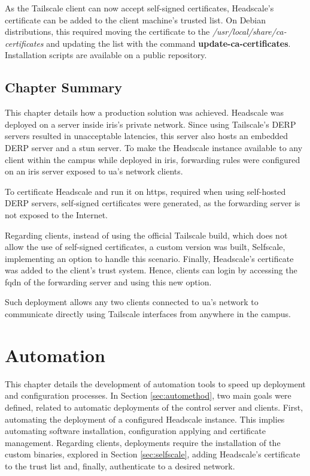 \documentclass[11pt,twoside,a4paper]{report}
\begin{document}
As the Tailscale client can now accept self-signed certificates, Headscale's certificate can be added to the client machine's trusted list. On Debian distributions, this required moving the certificate to the \emph{/usr/local/share/ca-certificates} and updating the list with the command \textbf{update-ca-certificates}. Installation scripts are available on a public repository.

\section{Chapter Summary}

This chapter details how a production solution was achieved. Headscale was deployed on a server inside \ac{iris}'s private network. Since using Tailscale's \ac{DERP} servers resulted in unacceptable latencies, this server also hosts an embedded \ac{DERP} server and a \ac{stun} server. To make the Headscale instance available to any client within the campus while deployed in \ac{iris}, forwarding rules were configured on an \ac{iris} server exposed to \ac{ua}'s network clients.

To certificate Headscale and run it on \ac{https}, required when using self-hosted \ac{DERP} servers, self-signed certificates were generated, as the forwarding server is not exposed to the Internet.

Regarding clients, instead of using the official Tailscale build, which does not allow the use of self-signed certificates, a custom version was built, Selfscale, implementing an option to handle this scenario. Finally, Headscale's certificate was added to the client's trust system. Hence, clients can login by accessing the \ac{fqdn} of the forwarding server and using this new option.

Such deployment allows any two clients connected to \ac{ua}'s network to communicate directly using Tailscale interfaces from anywhere in the campus.

\chapter{Automation}

This chapter details the development of automation tools to speed up deployment and configuration processes. In Section \ref{sec:automethod}, two main goals were defined, related to automatic deployments of the control server and clients. First, automating the deployment of a configured Headscale instance. This implies automating software installation, configuration applying and certificate management. Regarding clients, deployments require the installation of the custom binaries, explored in Section \ref{sec:selfscale}, adding Headscale's certificate to the trust list and, finally, authenticate to a desired network.
\end{document}
